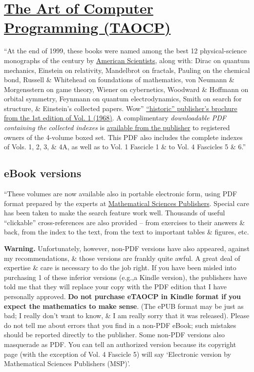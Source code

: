 \documentclass[oneside]{book}
\numberwithin{equation}{section}
\begin{document}
\section*{\href{https://www-cs-faculty.stanford.edu/~knuth/taocp.html}{The Art of Computer Programming (TAOCP)}}
``At the end of 1999, these books were named among the best 12 physical-science monographs of the century by \href{http://web.mnstate.edu/schwartz/centurylist2.html}{American Scientists}, along with: Dirac on quantum mechanics, Einstein on relativity, Mandelbrot on fractals, Pauling on the chemical bond, Russell \& Whitehead on foundations of mathematics, von Neumann \& Morgensstern on game theory, Wiener on cybernetics, Woodward \& Hoffmann on orbital symmetry, Feynmann on quantum electrodynamics, Smith on search for structure, \& Einstein's collected papers. Wow'' \href{https://www-cs-faculty.stanford.edu/~knuth/taocp.html}{``historic'' publisher's brochure from the 1st edition of Vol. 1 (1968)}. A complimentary \textit{downloadable PDF containing the collected indexes} is \href{https://www.informit.com/store/art-of-computer-programming-volumes-1-4a-boxed-set-9780321751041}{available from the publisher} to registered owners of the 4-volume boxed set. This PDF also includes the complete indexes of Vols. 1, 2, 3, \& 4A, as well as to Vol. 1 Fascicle 1 \& to Vol. 4 Fascicles 5 \& 6.''

\subsection*{eBook versions}
``These volumes are now available also in portable electronic form, using PDF format prepared by the experts at \href{https://msp.org/}{Mathematical Sciences Publishers}. Special care has been taken to make the search feature work well. Thousands of useful ``clickable'' cross-references are also provided -- from exercises to their answers \& back, from the index to the text, from the text to important tables \& figures, etc.

\textbf{Warning.} Unfortunately, however, non-PDF versions have also appeared, against my recommendations, \& those versions are frankly quite awful. A great deal of expertise \& care is necessary to do the job right. If you have been misled into purchasing 1 of these inferior versions (e.g.,a Kindle version), the publishers have told me that they will replace your copy with the PDF edition that I have personally approved. \textbf{Do not purchase eTAOCP in Kindle format if you expect the mathematics to make sense}. (The ePUB format may be just as bad; I really don't want to know, \& I am really sorry that it was released). Please do not tell me about errors that you find in a non-PDF eBook; such mistakes should be reported directly to the publisher. Some non-PDF versions also masquerade as PDF. You can tell an authorized version because its copyright page (with the exception of Vol. 4 Fascicle 5) will say `Electronic version by Mathematical Sciences Publishers (MSP)'.
\end{document}
